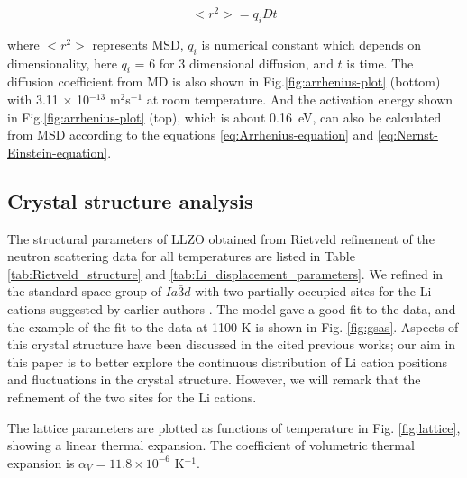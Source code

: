 \documentclass[twoside,twocolumn,9pt]{article}
\begin{document}
\begin{equation}
<r^2>=q_iDt
\end{equation}

where $<r^2>$ represents MSD, $q_i$ is numerical constant which depends on dimensionality, here $q_i$ = 6 for 3 dimensional diffusion,
and $t$ is time. The diffusion coefficient from MD is also shown in Fig.\ref{fig:arrhenius-plot} (bottom) with 3.11 $\times$ 10$^{-13}$ m$^2$s$^{-1}$ at room temperature.
And the activation energy shown in Fig.\ref{fig:arrhenius-plot} (top), which is about 0.16~eV, can also be calculated from MSD according to the equations \ref{eq:Arrhenius-equation} and \ref{eq:Nernst-Einstein-equation}.


\subsection{Crystal structure analysis}

The structural parameters of LLZO obtained from Rietveld refinement of the neutron scattering data for all temperatures are listed in Table \ref{tab:Rietveld_structure} and \ref{tab:Li_displacement_parameters}. We refined in the standard space group of $Ia\bar{3}d$ with two partially-occupied sites for the Li cations suggested by earlier authors  \cite{Awaka:2009jv,Buschmann:2011jo,Geiger:2011cg, Awaka:2011il, DanielRettenwander:2016ei,Wagner:2016bh,Kataoka:2019go, Xie:2011gv,Han:2012is,Li:2012fz,Wang:2014ic}. The model gave a good fit to the data, and the example of the fit to the data at 1100 K is shown in Fig. \ref{fig:gsas}.  Aspects of this crystal structure have been discussed in the cited previous works; our aim in this paper is to better explore the continuous distribution of Li cation positions and fluctuations in the crystal structure. However, we will remark that the refinement of the two sites for the Li cations.

The lattice parameters are plotted as functions of temperature in Fig. \ref{fig:lattice}, showing a linear thermal expansion. The coefficient of volumetric thermal expansion is $\alpha_V = 11.8 \times 10^{-6}$ K$^{-1}$.
\end{document}
